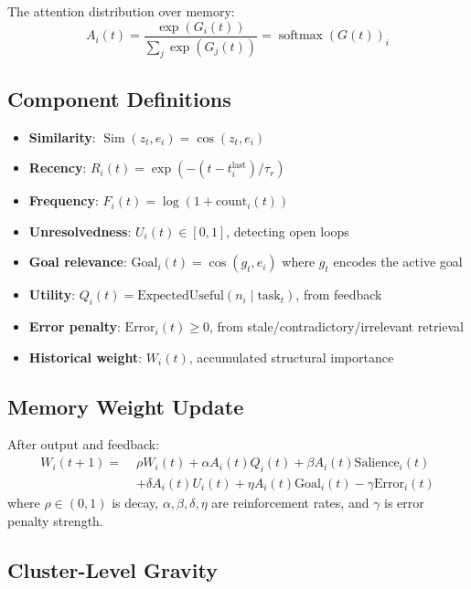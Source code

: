 \documentclass{article}
\newcommand{\softmax}{\operatorname{softmax}}
\newcommand{\simfn}{\operatorname{Sim}}
\begin{document}
The attention distribution over memory:
\begin{equation}
A_i(t) = \frac{\exp(G_i(t))}{\sum_j \exp(G_j(t))} = \softmax(G(t))_i
\end{equation}

\subsection{Component Definitions}

\begin{itemize}[leftmargin=2em,itemsep=2pt]
\item \textbf{Similarity}: $\simfn(z_t, e_i) = \cos(z_t, e_i)$
\item \textbf{Recency}: $R_i(t) = \exp(-(t - t_i^{\text{last}})/\tau_r)$
\item \textbf{Frequency}: $F_i(t) = \log(1 + \text{count}_i(t))$
\item \textbf{Unresolvedness}: $U_i(t) \in [0,1]$, detecting open loops
\item \textbf{Goal relevance}: $\text{Goal}_i(t) = \cos(g_t, e_i)$ where $g_t$ encodes the active goal
\item \textbf{Utility}: $Q_i(t) = \text{ExpectedUseful}(n_i \mid \text{task}_t)$, from feedback
\item \textbf{Error penalty}: $\text{Error}_i(t) \geq 0$, from stale/contradictory/irrelevant retrieval
\item \textbf{Historical weight}: $W_i(t)$, accumulated structural importance
\end{itemize}

\subsection{Memory Weight Update}

After output and feedback:
\begin{align}
W_i(t+1) =\;& \rho W_i(t) + \alpha A_i(t) Q_i(t) + \beta A_i(t) \text{Salience}_i(t) \nonumber\\
&+ \delta A_i(t) U_i(t) + \eta A_i(t) \text{Goal}_i(t) - \gamma \text{Error}_i(t)
\end{align}
where $\rho \in (0,1)$ is decay, $\alpha, \beta, \delta, \eta$ are reinforcement rates, and $\gamma$ is error penalty strength.

\subsection{Cluster-Level Gravity}
\end{document}
